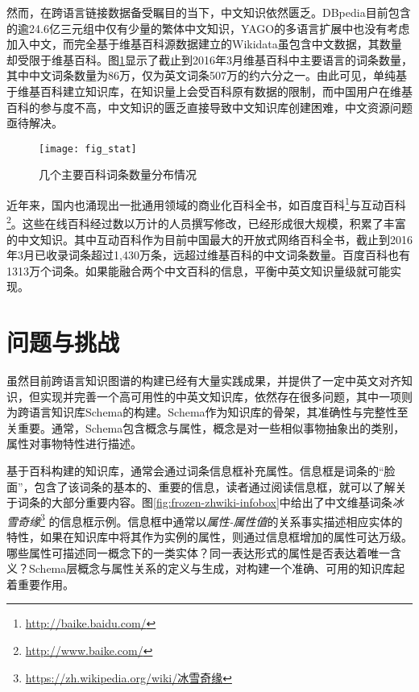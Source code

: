然而，在跨语言链接数据备受瞩目的当下，中文知识依然匮乏。DBpedia目前包含的逾24.6亿三元组中仅有少量的繁体中文知识，YAGO的多语言扩展中也没有考虑加入中文，而完全基于维基百科源数据建立的Wikidata虽包含中文数据，其数量却受限于维基百科。图\ref{fig:wiki-stat}显示了截止到2016年3月维基百科中主要语言的词条数量，其中中文词条数量为86万，仅为英文词条507万的约六分之一。由此可见，单纯基于维基百科建立知识库，在知识量上会受百科原有数据的限制，而中国用户在维基百科的参与度不高，中文知识的匮乏直接导致中文知识库创建困难，中文资源问题亟待解决。

\begin{figure}[h]
  \centering
  \texttt{[image: fig\_stat]}
  \caption{几个主要百科词条数量分布情况}
  \label{fig:wiki-stat}
\end{figure}

近年来，国内也涌现出一批通用领域的商业化百科全书，如百度百科\footnote{\url{http://baike.baidu.com/}}与互动百科\footnote{\url{http://www.baike.com/}}。这些在线百科经过数以万计的人员撰写修改，已经形成很大规模，积累了丰富的中文知识。其中互动百科作为目前中国最大的开放式网络百科全书，截止到2016年3月已收录词条超过1,430万条，远超过维基百科的中文词条数量。百度百科也有1313万个词条。如果能融合两个中文百科的信息，平衡中英文知识量级就可能实现。


\section{问题与挑战}

虽然目前跨语言知识图谱的构建已经有大量实践成果，并提供了一定中英文对齐知识，但实现并完善一个高可用性的中英文知识库，依然存在很多问题，其中一项则为跨语言知识库Schema的构建。Schema作为知识库的骨架，其准确性与完整性至关重要。通常，Schema包含概念与属性，概念是对一些相似事物抽象出的类别，属性对事物特性进行描述。

基于百科构建的知识库，通常会通过词条信息框补充属性。信息框是词条的“脸面”，包含了该词条的基本的、重要的信息，读者通过阅读信息框，就可以了解关于词条的大部分重要内容。图\ref{fig:frozen-zhwiki-infobox}中给出了中文维基词条\textit{冰雪奇缘}\footnote{\url{https://zh.wikipedia.org/wiki/冰雪奇缘}} 的信息框示例。信息框中通常以\textit{属性-属性值}的关系事实描述相应实体的特性，如果在知识库中将其作为实例的属性，则通过信息框增加的属性可达万级。哪些属性可描述同一概念下的一类实体？同一表达形式的属性是否表达着唯一含义？Schema层概念与属性关系的定义与生成，对构建一个准确、可用的知识库起着重要作用。

